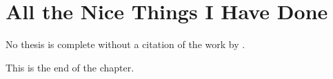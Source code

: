 \chapter{All the Nice Things I Have Done}
\label{chap:contribution}

No thesis is complete without a citation of the work by \citet{Cousot77}.



This is the end of the chapter\cn.
